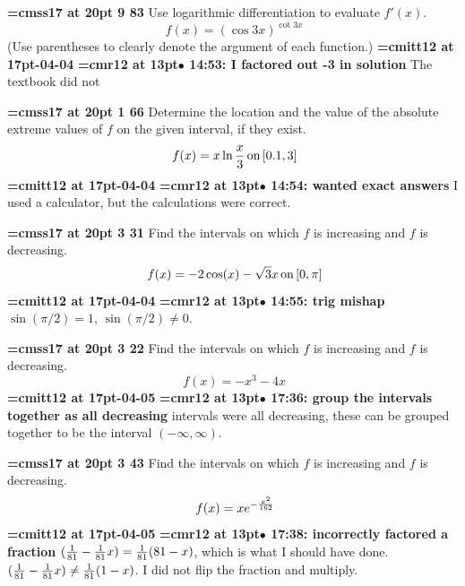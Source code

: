 {\medskip\noindent\bf\font\titlefont=cmss17 at 20pt 9 83}\medskip
Use logarithmic differentiation to evaluate $f'(x)$.
$$\
f(x) = (\cos 3x)^{\cot 3x}
$$
(Use parentheses to clearly denote the argument of each function.)
{\medskip\noindent\bf\font\titlefont=cmitt12 at 17pt\titlefont 2026-04-04}\medskip
{\smallskip\noindent\bf\font\titlefont=cmr12 at 13pt\titlefont $\bullet$ 14:53: I factored out -3 in solution}\smallskip
The textbook did not
\par

{\medskip\noindent\bf\font\titlefont=cmss17 at 20pt 1 66}\medskip
Determine the location and the value of the absolute extreme
values of $f$ on the given interval, if they exist.
$$\
f(x) = x\ln{x \over 3} \, \hbox{on} \, [0.1, 3]
$$
{\medskip\noindent\bf\font\titlefont=cmitt12 at 17pt-04-04}\medskip
{\smallskip\noindent\bf\font\titlefont=cmr12 at 13pt\titlefont $\bullet$ 14:54: wanted exact answers}\smallskip
I used a calculator, but the calculations were correct.
\par

{\medskip\noindent\bf\font\titlefont=cmss17 at 20pt 3 31}\medskip
Find the intervals on which $f$ is increasing and $f$ is decreasing.
$$\
f(x) = -2 \cos (x) - \sqrt{3} x \, \hbox{on} \, [0, \pi]
$$
{\medskip\noindent\bf\font\titlefont=cmitt12 at 17pt-04-04}\medskip
{\smallskip\noindent\bf\font\titlefont=cmr12 at 13pt\titlefont $\bullet$ 14:55: trig mishap}\smallskip
$\sin(\pi / 2) = 1$, $\sin(\pi / 2) \ne 0$.
\par

{\medskip\noindent\bf\font\titlefont=cmss17 at 20pt 3 22}\medskip
Find the intervals on which $f$ is increasing and $f$ is decreasing.
$$\
f(x) = -x^3 - 4x
$$
{\medskip\noindent\bf\font\titlefont=cmitt12 at 17pt\titlefont 2026-04-05}\medskip
{\smallskip\noindent\bf\font\titlefont=cmr12 at 13pt\titlefont $\bullet$ 17:36: group the intervals together as all decreasing}\smallskip
3 intervals were all decreasing, these can be grouped together to be the interval $(-\infty, \infty)$.
\par

\xrdef{node112}
{\medskip\noindent\bf\font\titlefont=cmss17 at 20pt\titlefont 4 3 43}\medskip
Find the intervals on which $f$ is increasing and $f$ is decreasing.
$$\
f(x) = xe^{-{x^2 \over 162}}
$$
{\medskip\noindent\bf\font\titlefont=cmitt12 at 17pt\titlefont 2026-04-05}\medskip
{\smallskip\noindent\bf\font\titlefont=cmr12 at 13pt\titlefont $\bullet$ 17:38: incorrectly factored a fraction}\smallskip
$({1 \over 81} - {1 \over 81}x) = {1 \over 81} (81 - x)$, which is what I should have done. $({1 \over 81} - {1 \over 81}x) \ne {1 \over 81}(1 - x)$. I did not flip the fraction and multiply.
\par

